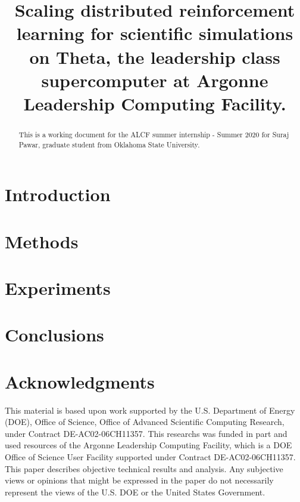 \documentclass[11pt]{article}
\newcommand{\ReportTitle}{Scaling distributed reinforcement learning for scientific simulations on Theta, the leadership class supercomputer at Argonne Leadership Computing Facility.} %
\begin{document}
\newpage
\normalsize

\newpage
\pagestyle{empty}
\begin{abstract}
This is a working document for the ALCF summer internship - Summer 2020 for Suraj Pawar, graduate student from Oklahoma State University. 
\end{abstract}
\newpage
\normalsize



\title{\textbf{\ReportTitle}}
\date{}
\maketitle
{}

\section{Introduction}

\section{Methods}

\section{Experiments}

\section{Conclusions}


 
\section*{Acknowledgments}
This material is based upon work supported by the U.S. Department of Energy (DOE), Office of Science, Office of Advanced Scientific Computing Research, under Contract DE-AC02-06CH11357. This researchs was funded in part and used resources of the Argonne Leadership Computing Facility, which is a DOE Office of Science User Facility supported under Contract DE-AC02-06CH11357. This paper describes objective technical results and analysis. Any subjective views or opinions that might be expressed in the paper do not necessarily represent the views of the U.S. DOE or the United States Government.
 
\end{document}
